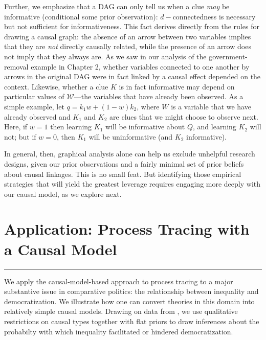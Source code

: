 \documentclass[
  12pt,
]{book}
\begin{document}
Further, we emphasize that a DAG can only tell us when a clue \emph{may} be informative (conditional some prior observation): \(d-\)connectedness is necessary but not sufficient for informativeness. This fact derives directly from the rules for drawing a causal graph: the absence of an arrow between two variables implies that they are \emph{not} directly causally related, while the presence of an arrow does not imply that they always are. As we saw in our analysis of the government-removal example in Chapter 2, whether variables connected to one another by arrows in the original DAG were in fact linked by a causal effect depended on the context. Likewise, whether a clue \(K\) is in fact informative may depend on particular values of \(\mathcal W\)---the variables that have already been observed. As a simple example, let \(q = k_1w + (1-w)k_2\), where \(W\) is a variable that we have already observed and \(K_1\) and \(K_2\) are clues that we might choose to observe next. Here, if \(w=1\) then learning \(K_1\) will be informative about \(Q\), and learning \(K_2\) will not; but if \(w=0\), then \(K_1\) will be uninformative (and \(K_2\) informative).

In general, then, graphical analysis alone can help us exclude unhelpful research designs, given our prior observations and a fairly minimal set of prior beliefs about causal linkages. This is no small feat. But identifying those empirical strategies that will yield the greatest leverage requires engaging more deeply with our causal model, as we explore next.

\hypertarget{ptapp}{%
\chapter{Application: Process Tracing with a Causal Model}\label{ptapp}}

\begin{center}\rule{0.5\linewidth}{0.5pt}\end{center}

We apply the causal-model-based approach to process tracing to a major substantive issue in comparative politics: the relationship between inequality and democratization. We illustrate how one can convert theories in this domain into relatively simple causal models. Drawing on data from \citet{haggard2012inequality}, we use qualitative restrictions on causal types together with flat priors to draw inferences about the probabilty with which inequality facilitated or hindered democratization.
\end{document}
